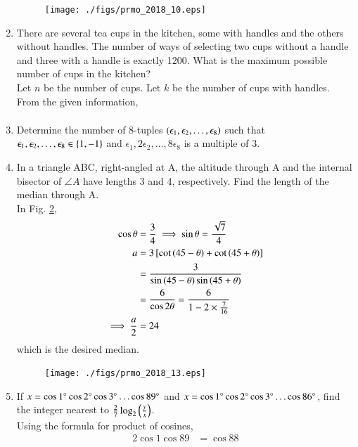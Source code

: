 \documentclass[journal,12pt,twocolumn]{IEEEtran}
\renewcommand\thesection{\arabic{section}}
\begin{document}
\begin{enumerate}[label=\thesection.\arabic*,ref=\thesection.\theenumi]
\begin{figure}[!ht]
\centering
\texttt{[image: ./figs/prmo\_2018\_10.eps]}
\caption{}
\label{fig:prmo_2018_10}
\end{figure}
\item There are several tea cups in the kitchen, some with handles and the others without handles. The number of ways of selecting two cups without a handle and three with a handle is exactly 1200. What is the maximum possible number of cups in the kitchen?
\\
\solution Let $n$ be the number of cups.  Let $k$ be the number of cups with handles. From the given information,
\begin{align}
\end{align}

\item  Determine the number of 8-tuples $\left(\epsilon_1, \epsilon_2, \dots , \epsilon_8\right)$ such that $\epsilon_1, \epsilon_2, \dots , \epsilon_8 \in \left\{1,-1\right\}$
and $\epsilon_1, 2\epsilon_2, \dots , 8\epsilon_8$
is a multiple of 3. 
\item In a triangle ABC, right-angled at A, the altitude through A and the internal bisector of $\angle A$ have lengths 3 and 4, respectively. Find the length of the median through A. 
\\
\solution In Fig. \ref{fig:prmo_2018_13},
\begin{align}
\cos \theta &= \frac{3}{4} \implies \sin\theta = \frac{\sqrt{7}}{4}
\\
a &= 3 {}\left[\cot \left(45-\theta\right)+\cot \left(45+\theta\right)\right]
\\
&=  \frac{3}{\sin \left(45-\theta\right)\sin \left(45+\theta\right)}
\\
&=  \frac{6}{\cos 2\theta} = \frac{6}{1-2\times  \frac{7}{16}}  
\\
\implies \frac{a}{2}&= 24
\end{align}
%
which is the desired median.
\begin{figure}[!ht]
\centering
\texttt{[image: ./figs/prmo\_2018\_13.eps]}
\caption{}
\label{fig:prmo_2018_13}
\end{figure}
\item If $x = \cos 1\degree \cos 2\degree \cos 3\degree \dots \cos 89\degree$
and $x = \cos 1\degree \cos 2\degree \cos 3\degree \dots \cos 86\degree$, find the integer nearest to $\frac{2}{7}\log_2\left(\frac{y}{x}\right)$.
\\
\solution Using the formula for product of cosines, 
%
\begin{align}
2\cos 1 \cos 89 &= \cos 88

\end{align}
\end{enumerate}
\end{document}
